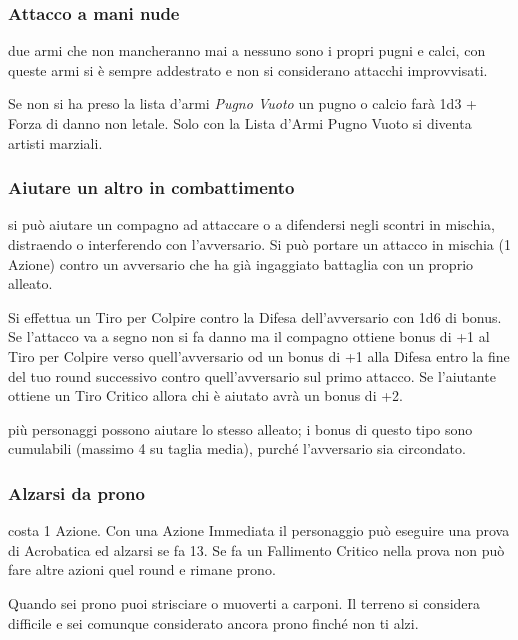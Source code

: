 \begin{multicols}{2}
\subsubsection{Attacco a mani nude}  \label{attaccomaninude}

due armi che non mancheranno mai a nessuno sono i propri pugni e calci, con queste armi si è sempre addestrato e non si considerano attacchi improvvisati.

Se non si ha preso la lista d'armi \emph{Pugno Vuoto} un pugno o calcio farà 1d3 + Forza di danno non letale. Solo con la Lista d'Armi Pugno Vuoto si diventa artisti marziali.

\subsubsection{Aiutare un altro in combattimento}\label{aiutare}\hypertarget{aiutare}{}

si può aiutare un compagno ad attaccare o a difendersi negli scontri in mischia, distraendo o interferendo con l'avversario. Si può portare un attacco in mischia (1 Azione) contro un avversario che ha già ingaggiato battaglia con un proprio alleato.

Si effettua un Tiro per Colpire contro la Difesa dell'avversario con 1d6 di bonus. Se l'attacco va a segno non si fa danno ma il compagno ottiene bonus di +1 al Tiro per Colpire verso quell'avversario od un bonus di +1 alla Difesa entro la fine del tuo round successivo contro quell'avversario sul primo attacco. Se l'aiutante ottiene un Tiro Critico allora chi è aiutato avrà un bonus di +2.

più personaggi possono aiutare lo stesso alleato; i bonus di questo tipo sono cumulabili (massimo 4 su taglia media), purché l'avversario sia circondato.

\subsubsection{Alzarsi da prono}\label{alzarsidaprono}\hypertarget{alzarsidaprono}{}

costa 1 Azione. Con una Azione Immediata il personaggio può eseguire una prova di Acrobatica ed alzarsi se fa 13. Se fa un Fallimento Critico nella prova non può fare altre azioni quel round e rimane prono.

Quando sei prono puoi strisciare o muoverti a carponi. Il terreno si considera difficile e sei comunque considerato ancora prono finché non ti alzi.


\end{multicols}
